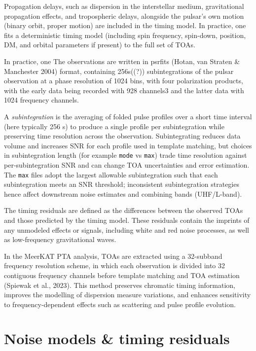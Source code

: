 \documentclass[12pt,a4paper]{article}
\begin{document}
Propagation delays, such as dispersion in the interstellar medium, gravitational propagation effects, and tropospheric delays, alongside the pulsar's own motion (binary orbit, proper motion) are included in the timing model. In practice, one fits a deterministic timing model (including spin frequency, spin-down, position, DM, and orbital parameters if present) to the full set of TOAs. 

In practice, one  The observations are written in psrfits (Hotan, van Straten \& Manchester 2004) format, containing 256s((?)) subintegrations of the pulsar observation at a phase resolution of 1024 bins, with four polarization products, with the early data being recorded with 928 channels3 and the latter data with 1024 frequency channels.

A \emph{subintegration} is the averaging of folded pulse profiles over a short time interval (here typically 256 s) to produce a single profile per subintegration while preserving time resolution across the observation. Subintegrating reduces data volume and increases SNR for each profile used in template matching, but choices in subintegration length (for example \texttt{mode} vs \texttt{max}) trade time resolution against per-subintegration SNR and can change TOA uncertainties and error estimation. The \texttt{max} files adopt the largest allowable subintegration such that each subintegration meets an SNR threshold; inconsistent subintegration strategies hence affect downstream noise estimates and combining bands (UHF/L-band).

The timing residuals are defined as the differences between the observed TOAs and those predicted by the timing model. These residuals contain the imprints of any unmodeled effects or signals, including white and red noise processes, as well as low-frequency gravitational waves.

In the MeerKAT PTA analysis, TOAs are extracted using a 32-subband frequency resolution scheme, in which each observation is divided into 32 contiguous frequency channels before template matching and TOA estimation (Spiewak et al., 2023). This method preserves chromatic timing information, improves the modelling of dispersion measure variations, and enhances sensitivity to frequency-dependent effects such as scattering and pulse profile evolution.


\section{Noise models \& timing residuals}
\end{document}
